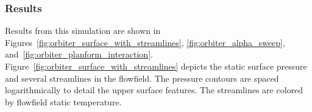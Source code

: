 \subsubsection{Results}
Results from this simulation are shown in Figures~\ref{fig:orbiter_surface_with_streamlines}, \ref{fig:orbiter_alpha_sweep}, and~\ref{fig:orbiter_planform_interaction}.  Figure~\ref{fig:orbiter_surface_with_streamlines} depicts the static surface pressure and several streamlines in the flowfield.  The pressure contours are spaced logarithmically to detail the upper surface features.  The streamlines are colored by flowfield static temperature.
\begin{figure}[hbtp]
  \begin{center}
     \\

\end{center}
\end{figure}
